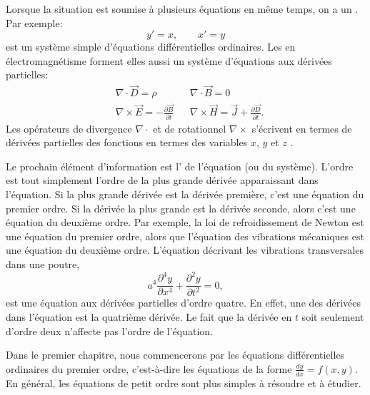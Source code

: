 Lorsque la situation est soumise à plusieurs équations en même temps, on a un
\emph{}.
Par exemple:
\begin{equation*}
	y' = x , \qquad x' = y
\end{equation*}
est un système simple d'équations différentielles ordinaires.
Les  en électromagnétisme forment elles aussi un système d'équations aux dérivées partielles:
\begin{align*}
	& \nabla \cdot \vec{D} = \rho & & \nabla \cdot \vec{B} = 0  \\
	& \nabla \times \vec{E} = - \frac{\partial \vec{B}}{\partial t} &
	& \nabla \times \vec{H} = \vec{J} + \frac{\partial \vec{D}}{\partial t} .
\end{align*}
Les opérateurs de divergence $\nabla \cdot$ et de rotationnel $\nabla \times$
s'écrivent en termes de dérivées partielles des fonctions en termes des variables $x$, $y$ et $z$ .

\medskip

Le prochain élément d'information est l'\emph{} de l'équation (ou du système).
L'ordre est tout simplement l'ordre de la plus grande dérivée apparaissant dans l'équation.
Si la plus grande dérivée est la dérivée première, c'est une équation du premier ordre.
Si la dérivée la plus grande est la dérivée seconde, alors c'est une équation du deuxième ordre.
Par exemple, la loi de refroidissement de Newton est une équation du premier ordre,
alors que l'équation des vibrations mécaniques est une équation du deuxième ordre.
L'équation décrivant les vibrations transversales dans une poutre,
\begin{equation*}
	a^4 \frac{\partial^4 y}{\partial x^4} + \frac{\partial^2 y}{\partial t^2} = 0,
\end{equation*}
est une équation aux dérivées partielles d'ordre quatre.
En effet, une des dérivées dans l'équation est la quatrième dérivée.
Le fait que la dérivée en $t$ soit seulement d'ordre deux n'affecte pas l'ordre de l'équation.

Dans le premier chapitre, nous commencerons par les équations différentielles ordinaires du premier ordre,
c'est-à-dire les équations de la forme $\frac{dy}{dx} = f(x,y)$.
En général, les équations de petit ordre sont plus simples à résoudre et à étudier.

\medskip

